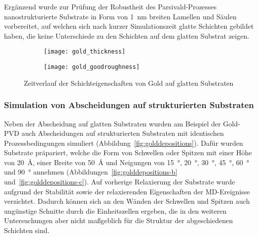Ergänzend wurde zur Prüfung der Robustheit des Parsivald-Prozesses nanostrukturierte Substrate in Form von \SI{1}{\nano\meter} breiten Lamellen und Säulen vorbereitet, auf welchen sich nach kurzer Simulationszeit glatte Schichten gebildet haben, die keine Unterschiede zu den Schichten auf dem glatten Substrat zeigen.

\begin{figure}[thp]
  \captionsetup[subfigure]{singlelinecheck=false}
  \def\subfigwidth{0.49\textwidth}

  \begin{subfigure}[t]{\subfigwidth}
    \texttt{[image: gold\_thickness]}
    \label{fig:goldsmooth-a}
  \end{subfigure}
  \hfill
  \begin{subfigure}[t]{\subfigwidth}
    \texttt{[image: gold\_goodroughness]}
    \label{fig:goldsmooth-b}
  \end{subfigure}

  \caption[Schichteigenschaften von Gold auf glatten Substraten]{
    Zeitverlauf der Schichteigenschaften von Gold auf glatten Substraten
  }
  \label{fig:goldsmooth}

\end{figure}

\subsubsection{Simulation von Abscheidungen auf strukturierten Substraten}

Neben der Abscheidung auf glatten Substraten wurden am Beispiel der Gold-PVD auch Abscheidungen auf strukturierten Substraten mit identischen Prozessbedingungen simuliert (Abbildung~\ref{fig:golddepositions}).
Dafür wurden Substrate präpariert, welche die Form von Schwellen oder Spitzen mit einer Höhe von \SI{20}{\angstrom}, einer Breite von \SI{50}{\angstrom} und Neigungen von \SI{15}{\degree}, \SI{20}{\degree}, \SI{30}{\degree}, \SI{45}{\degree}, \SI{60}{\degree} und \SI{90}{\degree} annehmen (Abbildungen~\ref{fig:golddepositions-b} und~\ref{fig:golddepositions-c}).
Auf vorherige Relaxierung der Substrate wurde aufgrund der Stabilität sowie der relaxierenden Eigenschaften der MD-Ereignisse verzichtet.
Dadurch können sich an den Wänden der Schwellen und Spitzen auch ungünstige Schnitte durch die Einheitszellen ergeben, die in den weiteren Untersuchungen aber nicht maßgeblich für die Struktur der abgeschiedenen Schichten sind.

